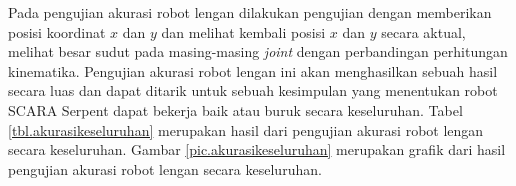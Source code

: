 Pada pengujian akurasi robot lengan dilakukan pengujian dengan memberikan posisi koordinat $x$ dan $y$ dan melihat kembali posisi $x$ dan $y$ secara aktual, melihat besar sudut pada masing-masing \textit{joint} dengan perbandingan perhitungan kinematika. Pengujian akurasi robot lengan ini akan menghasilkan sebuah hasil secara luas dan dapat ditarik untuk sebuah kesimpulan yang menentukan robot SCARA Serpent dapat bekerja baik atau buruk secara keseluruhan. Tabel \ref{tbl.akurasikeseluruhan} merupakan hasil dari pengujian akurasi robot lengan secara keseluruhan. Gambar \ref{pic.akurasikeseluruhan} merupakan grafik dari hasil pengujian akurasi robot lengan secara keseluruhan.
